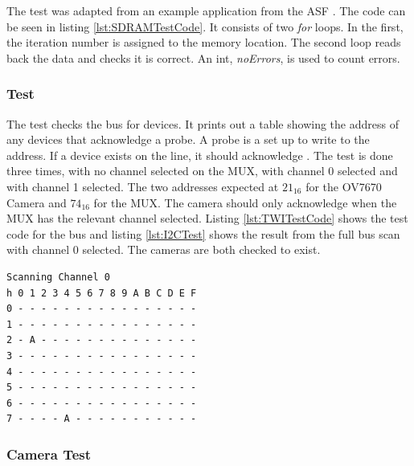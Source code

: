 The test was adapted from an example application from the ASF \citep{Atmel:ASF}. The code can be seen in listing \ref{lst:SDRAMTestCode}. It consists of two \textit{for} loops. In the first, the iteration number is assigned to the memory location. The second loop reads back the data and checks it is correct. An int, \textit{noErrors}, is used to count errors. 



\subsubsection{\itc Test}\label{I2C:Test}
The \itc test checks the bus for devices. It prints out a table showing the address of any devices that acknowledge a probe. A probe is a set up to write to the address. If a device exists on the line, it should acknowledge \citep{Philips:I2C}. The test is done three times, with no channel selected on the \itc MUX, with channel 0 selected and with channel 1 selected. The two addresses expected at $21_{16}$ for the OV7670 Camera and $74_{16}$ for the \itc MUX. The camera should only acknowledge when the \itc MUX has the relevant channel selected. Listing \ref{lst:TWITestCode} shows the test code for the \itc bus and listing \ref{lst:I2CTest} shows the result from the full bus scan with channel 0 selected. The cameras are both checked to exist.


\begin{lstlisting}[caption={Result of \itc bus scan with Channel 0 of the \itc MUX selected},label={lst:I2CTest}]
Scanning Channel 0
h 0 1 2 3 4 5 6 7 8 9 A B C D E F
0 - - - - - - - - - - - - - - - -
1 - - - - - - - - - - - - - - - -
2 - A - - - - - - - - - - - - - -
3 - - - - - - - - - - - - - - - -
4 - - - - - - - - - - - - - - - -
5 - - - - - - - - - - - - - - - -
6 - - - - - - - - - - - - - - - -
7 - - - - A - - - - - - - - - - -
\end{lstlisting}

\subsubsection{Camera Test}\label{Camera:Test}

